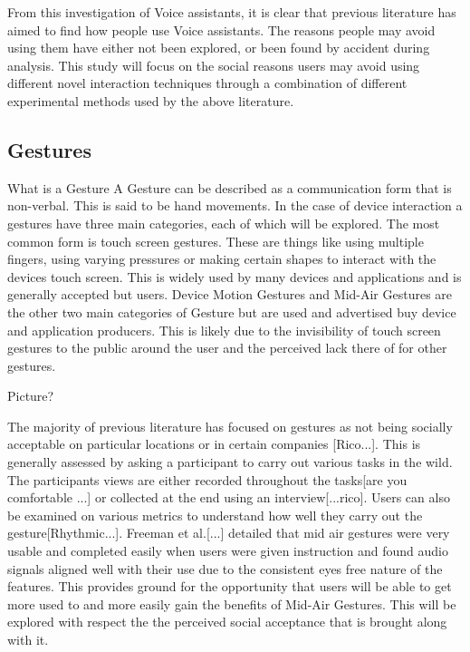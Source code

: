 \documentclass{l4proj}
\begin{document}
From this investigation of Voice assistants, it is clear that previous literature has aimed to find how people use Voice assistants. The reasons people may avoid using them have either not been explored, or been found by accident during analysis. This study will focus on the social reasons users may avoid using different novel interaction techniques through a combination of different experimental methods used by the above literature.

\subsection{Gestures}

What is a Gesture
A Gesture can be described as a communication form that is non-verbal. This is said to be hand movements. In the case of device interaction a gestures have three main categories, each of which will be explored. The most common form is touch screen gestures. These are things like using multiple fingers, using varying pressures or making certain shapes to interact with the devices touch screen. This is widely used by many devices and applications and is generally accepted but users. Device Motion Gestures and Mid-Air Gestures are the other two main categories of Gesture but are used and advertised buy device and application producers. This is likely due to the invisibility of touch screen gestures to the public around the user and the perceived lack there of for other gestures. 

Picture?

The majority of previous literature has focused on gestures as not being socially acceptable on particular locations or in certain companies [Rico...]. This is generally assessed by asking a participant to carry out various tasks in the wild. The participants views are either recorded throughout the tasks[are you comfortable ...] or collected at the end using an interview[...rico]. Users can also be examined on various metrics to understand how well they carry out the gesture[Rhythmic...]. Freeman et al.[...] detailed that mid air gestures were very usable and completed easily when users were given instruction and found audio signals aligned well with their use due to the consistent eyes free nature of the features. This provides ground for the opportunity that users will be able to get more used to and more easily gain the benefits of Mid-Air Gestures. This will be explored with respect the the perceived social acceptance that is brought along with it.
\end{document}
